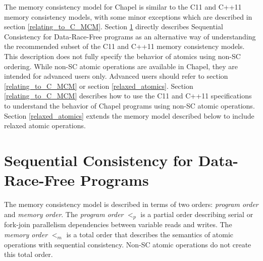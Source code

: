 The memory consistency model for Chapel is similar to the C11 and C++11
memory consistency models, with some minor exceptions which are described
in section \ref{relating_to_C_MCM}. Section \ref{SC_for_DRF} directly
describes Sequential Consistency for Data-Race-Free programs as an
alternative way of understanding the recommended subset of the C11 and
C++11 memory consistency models. This description does not fully specify
the behavior of atomics using non-SC ordering. While non-SC atomic
operations are available in Chapel, they are intended for advanced users
only.  Advanced users should refer to section \ref{relating_to_C_MCM} or
section \ref{relaxed_atomics}. Section \ref{relating_to_C_MCM} describes
how to use the C11 and C++11 specifications to understand the behavior of
Chapel programs using non-SC atomic operations. Section
\ref{relaxed_atomics} extends the memory model described below to include
relaxed atomic operations.

\section{Sequential Consistency for Data-Race-Free Programs}
\label{SC_for_DRF}

The memory consistency model is described in terms of two orders:
\textit{program order} and \textit{memory order}. The \textit{program order}
$<_p$ is a partial order describing serial or fork-join parallelism
dependencies between variable reads and writes. The \textit{memory order} $<_m$
is a total order that describes the semantics of atomic operations with
sequential consistency. Non-SC atomic operations do not create this total
order.

